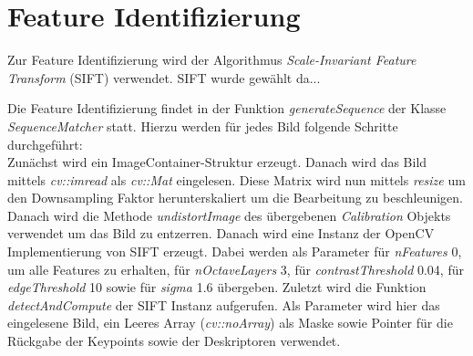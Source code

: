 \section{Feature Identifizierung}
Zur Feature Identifizierung wird der Algorithmus \emph{Scale-Invariant Feature Transform} (SIFT) verwendet.
SIFT wurde gewählt da...

Die Feature Identifizierung findet in der Funktion \emph{generateSequence} der Klasse \emph{SequenceMatcher} statt.
Hierzu werden für jedes Bild folgende Schritte durchgeführt:\\
Zunächst wird ein ImageContainer-Struktur erzeugt.
Danach wird das Bild mittels \emph{cv::imread} als \emph{cv::Mat} eingelesen.
Diese Matrix wird nun mittels \emph{resize} um den Downsampling Faktor herunterskaliert um die Bearbeitung zu beschleunigen.
Danach wird die Methode \emph{undistortImage} des übergebenen \emph{Calibration} Objekts verwendet um das Bild zu entzerren.
Danach wird eine Instanz der OpenCV Implementierung von SIFT erzeugt.
Dabei werden als Parameter für \emph{nFeatures} 0, um alle Features zu erhalten, für \emph{nOctaveLayers} 3, für \emph{contrastThreshold} 0.04, für \emph{edgeThreshold} 10 sowie für \emph{sigma} 1.6 übergeben.
Zuletzt wird die Funktion \emph{detectAndCompute} der SIFT Instanz aufgerufen.
Als Parameter wird hier das eingelesene Bild, ein Leeres Array (\emph{cv::noArray}) als Maske sowie Pointer für die Rückgabe der Keypoints sowie der Deskriptoren verwendet.
